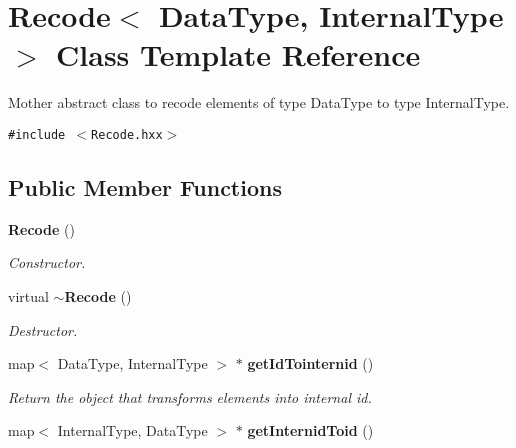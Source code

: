 \section{Recode$<$ Data\-Type, Internal\-Type $>$ Class Template Reference}
\label{class_recode}
Mother abstract class to recode elements of type Data\-Type to type Internal\-Type.  


{\tt \#include $<$Recode.hxx$>$}

\subsection*{Public Member Functions}
\begin{CompactItemize}
\item 
{\bf Recode} ()\label{class_recode_9a4d8568ab77ad30030b91492355e776}

\begin{CompactList}\small\item\em Constructor. \item\end{CompactList}\item 
virtual {\bf $\sim$Recode} ()\label{class_recode_47d4f7b6266ac0ae568551ca6d3b6785}

\begin{CompactList}\small\item\em Destructor. \item\end{CompactList}\item 
map$<$ Data\-Type, Internal\-Type $>$ $\ast$ {\bf get\-Id\-Tointernid} ()\label{class_recode_d9f47604af61deddd790e82658442882}

\begin{CompactList}\small\item\em Return the object that transforms elements into internal id. \item\end{CompactList}\item 
map$<$ Internal\-Type, Data\-Type $>$ $\ast$ {\bf get\-Internid\-Toid} ()\label{class_recode_9ab4c3ab3202b1bf6b22887de9427ee7}


\end{CompactItemize}

